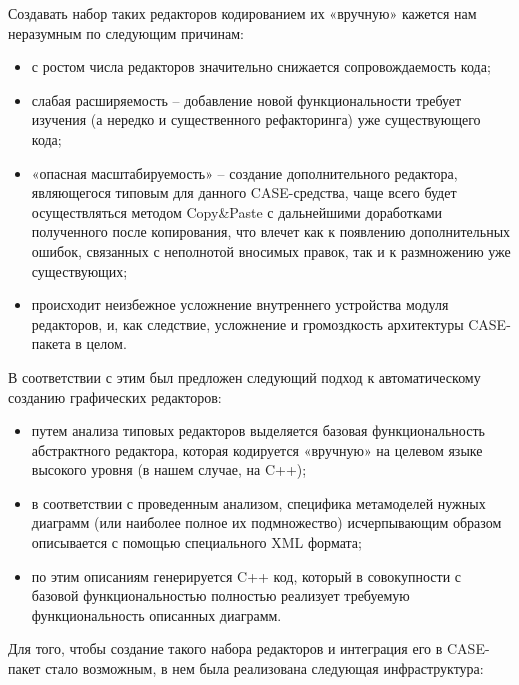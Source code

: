 \documentclass[a4paper]{article}
\newcommand\liststyleWWviiiNumxviii{%
\renewcommand\theenumi{\arabic{enumi}}
\renewcommand\theenumii{\arabic{enumii}}
\renewcommand\theenumiii{\arabic{enumiii}}
\renewcommand\labelitemi{o}
\renewcommand\labelenumi{\theenumi.}
\renewcommand\labelenumii{\theenumii.}
\renewcommand\labelenumiii{\theenumiii.}
}
\newcommand\liststyleWWviiiNumxi{%
\renewcommand\theenumi{\arabic{enumi}}
\renewcommand\theenumii{\arabic{enumii}}
\renewcommand\theenumiii{\arabic{enumiii}}
\renewcommand\labelitemi{o}
\renewcommand\labelenumi{\theenumi.}
\renewcommand\labelenumii{\theenumii.}
\renewcommand\labelenumiii{\theenumiii.}
}
\begin{document}
{
Создавать набор таких редакторов кодированием их «вручную» кажется нам
неразумным по следующим причинам:}

\liststyleWWviiiNumxviii
\begin{itemize}
\item {
с ростом числа редакторов значительно снижается сопровождаемость кода;}
\item {
слабая расширяемость – добавление новой функциональности требует
изучения (а нередко и существенного рефакторинга) уже существующего
кода;}
\item {
«опасная масштабируемость» – создание дополнительного редактора,
являющегося типовым для данного
\foreignlanguage{english}{CASE}{}-средства, чаще всего будет
осуществляться методом
\foreignlanguage{english}{Copy}\&\foreignlanguage{english}{Paste} с
дальнейшими доработками полученного после копирования, что влечет как к
появлению дополнительных ошибок, связанных с неполнотой вносимых
правок, так и к размножению уже существующих;}
\item {
происходит неизбежное усложнение внутреннего устройства модуля
редакторов, и, как следствие, усложнение и громоздкость архитектуры
\foreignlanguage{english}{CASE}{}-пакета в целом.}
\end{itemize}
{
В соответствии с этим был предложен следующий подход к автоматическому
созданию графических редакторов: }

\liststyleWWviiiNumxi
\begin{itemize}
\item {
путем анализа типовых редакторов выделяется базовая функциональность
абстрактного редактора, которая кодируется «вручную» на целевом языке
высокого уровня (в нашем случае, на \foreignlanguage{english}{C}++);}
\item {
в соответствии с проведенным анализом, специфика метамоделей нужных
диаграмм (или наиболее полное их подмножество) исчерпывающим образом
описывается с помощью специального \foreignlanguage{english}{XML}
формата;}
\item {
по этим описаниям генерируется \foreignlanguage{english}{C}++ код,
который в совокупности с базовой функциональностью полностью реализует
требуемую функциональность описанных диаграмм.}
\end{itemize}
{
Для того, чтобы создание такого набора редакторов и интеграция его в
\foreignlanguage{english}{CASE}{}-пакет стало возможным, в нем была
реализована следующая инфраструктура:}
\end{document}

